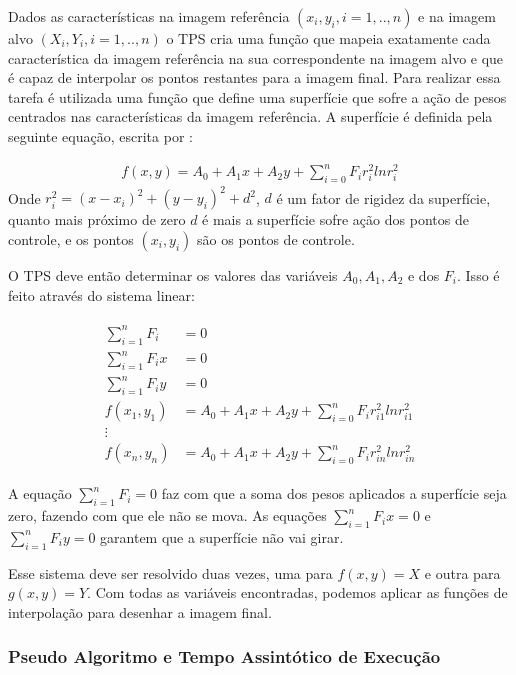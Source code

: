     Dados as características na imagem referência $(x_i,y_i, i=1,..,n)$ e na imagem alvo $(X_i,Y_i, i=1,..,n)$
o TPS cria uma função que mapeia exatamente cada característica da imagem referência na sua
correspondente na imagem alvo e que é capaz de interpolar os pontos restantes para a imagem final. Para realizar
essa tarefa é utilizada uma função que define uma superfície que sofre a ação de pesos centrados nas
características da imagem referência. A superfície é definida pela seguinte equação, escrita por \cite{bookstein1989principal}:

\begin{align}\label{math:tps}
    f(x,y) = A_0 + A_1x + A_2y + \sum_{i=0}^n F_i r_i^2 ln r_i^2
\end{align}
Onde $r_i^2 = (x-x_i)^2 + (y-y_i)^2 + d^2$, $d$ é um fator de rigidez da superfície, quanto mais próximo de 
zero $d$ é mais a superfície sofre ação dos pontos de controle, e os pontos $(x_i, y_i)$ são os pontos de controle.

    O TPS deve então determinar os valores das variáveis $A_0, A_1, A_2$ e dos $F_i$. 
Isso é feito através do sistema linear:

\begin{align}
\begin{split}
    \sum_{i=1}^n F_i &= 0 \\
    \sum_{i=1}^n F_ix &= 0 \\
    \sum_{i=1}^n F_iy &= 0 \\
    f(x_1,y_1) &= A_0 + A_1x + A_2y + \sum_{i=0}^n F_i r_{i1}^2 ln r_{i1}^2 \\
    \vdots \\
    f(x_n,y_n) &= A_0 + A_1x + A_2y + \sum_{i=0}^n F_i r_{in}^2 ln r_{in}^2
\end{split}
\end{align}

A equação $\sum_{i=1}^n F_i = 0$ faz com que a soma dos pesos aplicados a superfície seja zero, fazendo com que
ele não se mova. As equações $\sum_{i=1}^n F_ix = 0$ e $\sum_{i=1}^n F_iy = 0$ garantem que a superfície não vai girar.

    Esse sistema deve ser resolvido duas vezes, uma para $f(x,y) = X$ e outra para $g(x,y) = Y$. Com todas as variáveis
encontradas, podemos aplicar as funções de interpolação para desenhar a imagem final.

\subsubsection{Pseudo Algoritmo e Tempo Assintótico de Execução}


